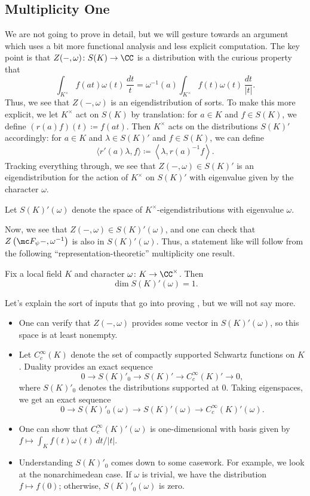 \documentclass{article}
\begin{document}
\subsection{Multiplicity One}
We are not going to prove  in detail, but we will gesture towards an argument which uses a bit more functional analysis and less explicit computation. The key point is that $Z(-,\omega)\colon S(K)\to\CC$ is a distribution with the curious property that
\[\int_{K^\times}f(at)\omega(t)\,\frac{dt}t=\omega^{-1}(a)\int_{K^\times}f(t)\omega(t)\,\frac{dt}{\left|t\right|}.\]
Thus, we see that $Z(-,\omega)$ is an eigendistribution of sorts. To make this more explicit, we let $K^\times$ act on $S(K)$ by translation: for $a\in K$ and $f\in S(K)$, we define $(r(a)f)(t)\coloneqq f(at)$. Then $K^\times$ acts on the distributions $S(K)'$ accordingly: for $a\in K$ and $\lambda\in S(K)'$ and $f\in S(K)$, we can define
\[\langle r'(a)\lambda,f\rangle\coloneqq\left\langle\lambda,r(a)^{-1}f\right\rangle.\]
Tracking everything through, we see that $Z(-,\omega)\in S(K)'$ is an eigendistribution for the action of $K^\times$ on $S(K)'$ with eigenvalue given by the character $\omega$.
\begin{notation}
	Let $S(K)'(\omega)$ denote the space of $K^\times$-eigendistributions with eigenvalue $\omega$.
\end{notation}
Now, we see that $Z(-,\omega)\in S(K)'(\omega)$, and one can check that $Z\left(\mc F_\psi-,\omega^{-1}\right)$ is also in $S(K)'(\omega)$. Thus, a statement like  will follow from the following ``representation-theoretic'' multiplicity one result.
\begin{theorem} \label{thm:mult-one}
	Fix a local field $K$ and character $\omega\colon K\to\CC^\times$. Then
	\[\dim S(K)'(\omega)=1.\]
\end{theorem}
Let's explain the sort of inputs that go into proving , but we will not say more.
\begin{itemize}
	\item One can verify that $Z(-,\omega)$ provides some vector in $S(K)'(\omega)$, so this space is at least nonempty.
	\item Let $C_c^\infty(K)$ denote the set of compactly supported Schwartz functions on $K$. Duality provides an exact sequence
	\[0\to S(K)'_0\to S(K)'\to C_c^\infty(K)'\to0,\]
	where $S(K)'_0$ denotes the distributions supported at $0$. Taking eigenspaces, we get an exact sequence
	\[0\to S(K)'_0(\omega)\to S(K)'(\omega)\to C_c^\infty(K)'(\omega).\]
	\item One can show that $C_c^\infty(K)'(\omega)$ is one-dimensional with basis given by $f\mapsto\int_Kf(t)\omega(t)\,dt/\left|t\right|$.
	\item Understanding $S(K)'_0$ comes down to some casework. For example, we look at the nonarchimedean case. If $\omega$ is trivial, we have the distribution $f\mapsto f(0)$; otherwise, $S(K)'_0(\omega)$ is zero.
\end{itemize}
\end{document}
